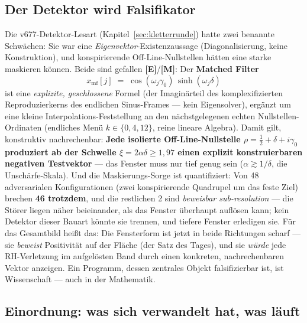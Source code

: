 \documentclass[11pt,a4paper]{article}
\newcommand{\E}{\textcolor{gut}{\textbf{[E]}}}
\newcommand{\M}{\textcolor{mess}{\textbf{[M]}}}
\begin{document}
\subsection*{Der Detektor wird Falsifikator}

Die v677-Detektor-Lesart (Kapitel~\ref{sec:kletterrunde}) hatte zwei
benannte Schwächen: Sie war eine \emph{Eigenvektor}-Existenzaussage
(Diagonalisierung, keine Konstruktion), und konspirierende
Off-Line-Nullstellen hätten eine starke maskieren können. Beide sind
gefallen \E{}/\M{}: Der \textbf{Matched Filter}
\[
x_{\mathrm{mf}}[j] \;=\; \cos(\omega_j \gamma_0)\,
\sinh(\omega_j \delta)
\]
ist eine \emph{explizite, geschlossene} Formel (der Imaginärteil des
komplexifizierten Reproduzierkerns des endlichen Sinus-Frames ---
kein Eigensolver), ergänzt um eine kleine
Interpolations-Feststellung an den nächstgelegenen echten
Nullstellen-Ordinaten (endliches Menü $k \in \{0, 4, 12\}$, reine
lineare Algebra). Damit gilt, konstruktiv nachrechenbar: \textbf{Jede
isolierte Off-Line-Nullstelle $\rho = \tfrac12 + \delta + i\gamma_0$
produziert ab der Schwelle $\xi = 2\alpha\delta \ge 1{,}97$ einen
explizit konstruierbaren negativen Testvektor} --- das Fenster muss
nur tief genug sein ($\alpha \gtrsim 1/\delta$, die
Unschärfe-Skala). Und die Maskierungs-Sorge ist quantifiziert: Von
48 adversarialen Konfigurationen (zwei konspirierende Quadrupel um
das feste Ziel) brechen \textbf{46 trotzdem}, und die restlichen 2
sind \emph{beweisbar sub-resolution} --- die Störer liegen näher
beieinander, als das Fenster überhaupt auflösen kann; kein Detektor
dieser Bauart könnte sie trennen, und tiefere Fenster erledigen sie.
Für das Gesamtbild heißt das: Die Fensterform ist jetzt in beide
Richtungen scharf --- sie \emph{beweist} Positivität auf der Fläche
(der Satz des Tages), und sie \emph{würde} jede
RH-Verletzung im aufgelösten Band durch einen konkreten,
nachrechenbaren Vektor anzeigen. Ein Programm, dessen zentrales
Objekt falsifizierbar ist, ist Wissenschaft --- auch in der
Mathematik.

\subsection*{Einordnung: was sich verwandelt hat, was läuft}
\end{document}
